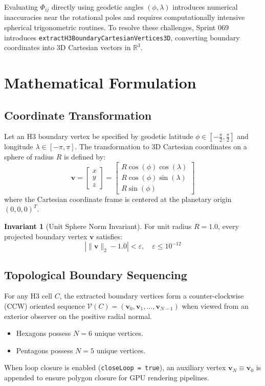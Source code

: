 \documentclass[10pt,twocolumn]{article}
\theoremstyle{definition}
\newtheorem{invariant}{Invariant}
\begin{document}
Evaluating $\Phi_{ij}$ directly using geodetic angles $(\phi, \lambda)$ introduces numerical inaccuracies near the rotational poles and requires computationally intensive spherical trigonometric routines. To resolve these challenges, Sprint 069 introduces \texttt{extractH3BoundaryCartesianVertices3D}, converting boundary coordinates into 3D Cartesian vectors in $\mathbb{R}^3$.

\section{Mathematical Formulation}

\subsection{Coordinate Transformation}
Let an H3 boundary vertex be specified by geodetic latitude $\phi \in [-\frac{\pi}{2}, \frac{\pi}{2}]$ and longitude $\lambda \in [-\pi, \pi]$. The transformation to 3D Cartesian coordinates on a sphere of radius $R$ is defined by:
\begin{equation}
\mathbf{v} = 
\begin{bmatrix}
x \\
y \\
z
\end{bmatrix}
=
\begin{bmatrix}
R \cos(\phi) \cos(\lambda) \\
R \cos(\phi) \sin(\lambda) \\
R \sin(\phi)
\end{bmatrix}
\end{equation}
where the Cartesian coordinate frame is centered at the planetary origin $(0, 0, 0)^T$.

\begin{invariant}[Unit Sphere Norm Invariant]
For unit radius $R = 1.0$, every projected boundary vertex $\mathbf{v}$ satisfies:
\begin{equation}
|\|\mathbf{v}\|_2 - 1.0| < \varepsilon, \quad \varepsilon \le 10^{-12}
\end{equation}
\end{invariant}

\subsection{Topological Boundary Sequencing}
For any H3 cell $C$, the extracted boundary vertices form a counter-clockwise (CCW) oriented sequence $\mathcal{V}(C) = (\mathbf{v}_0, \mathbf{v}_1, \dots, \mathbf{v}_{N-1})$ when viewed from an exterior observer on the positive radial normal.
\begin{itemize}
    \item Hexagons possess $N = 6$ unique vertices.
    \item Pentagons possess $N = 5$ unique vertices.
\end{itemize}
When loop closure is enabled (\texttt{closeLoop = true}), an auxiliary vertex $\mathbf{v}_N \equiv \mathbf{v}_0$ is appended to ensure polygon closure for GPU rendering pipelines.
\end{document}
